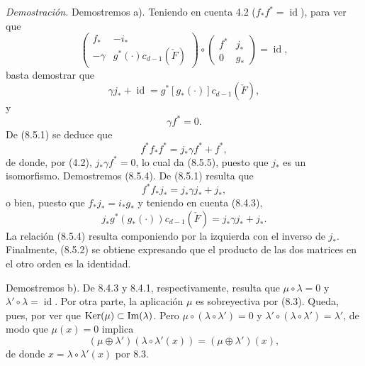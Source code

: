 \emph{Demostración.} Demostremos a). Teniendo en cuenta 4.2 ($f_*f^*=\operatorname{id}$), para ver que
\[
\begin{pmatrix}
f_*&-i_*\\
-\gamma&g^*(\cdot)c_{d-1}(\check F)
\end{pmatrix}
\circ
\begin{pmatrix}
f^*&j_*\\
0&g_*
\end{pmatrix}
=\operatorname{id},
\]
basta demostrar que
\[
\gamma j_*+\operatorname{id}=g^*[g_*(\cdot)]c_{d-1}(\check F),
\tag{8.5.4}
\]
y
\[
\gamma f^*=0.
\tag{8.5.5}
\]
De (8.5.1) se deduce que
\[
f^*f_*f^*=j_*\gamma f^*+f^*,
\]
de donde, por (4.2), $j_*\gamma f^*=0$, lo cual da (8.5.5), puesto que $j_*$ es un isomorfismo. Demostremos (8.5.4). De (8.5.1) resulta que
\[
f^*f_*j_*=j_*\gamma j_*+j_*,
\]
o bien, puesto que $f_*j_*=i_*g_*$ y teniendo en cuenta (8.4.3),
\[
j_*g^*(g_*(\cdot))c_{d-1}(\check F)=j_*\gamma j_*+j_*.
\]
La relación (8.5.4) resulta componiendo por la izquierda con el inverso de $j_*$. Finalmente, (8.5.2) se obtiene expresando que el producto de las dos matrices en el otro orden es la identidad.

Demostremos b). De 8.4.3 y 8.4.1, respectivamente, resulta que $\mu\circ\lambda=0$ y $\lambda'\circ\lambda=\operatorname{id}$. Por otra parte, la aplicación $\mu$ es sobreyectiva por (8.3). Queda, pues, por ver que $\operatorname{Ker}(\mu)\subset\operatorname{Im}(\lambda)$. Pero $\mu\circ(\lambda\circ\lambda')=0$ y $\lambda'\circ(\lambda\circ\lambda')=\lambda'$, de modo que $\mu(x)=0$ implica
\[
(\mu\oplus\lambda')(\lambda\circ\lambda'(x))=(\mu\oplus\lambda')(x),
\]
de donde $x=\lambda\circ\lambda'(x)$ por 8.3.
